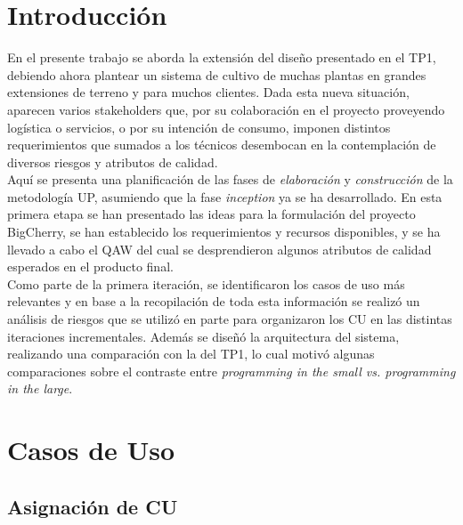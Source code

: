 \section{Introducción}

En el presente trabajo se aborda la extensión del diseño presentado en el TP1, debiendo ahora plantear un sistema de cultivo de muchas plantas en grandes extensiones de terreno y para muchos clientes. Dada esta nueva situación, aparecen varios stakeholders que, por su colaboración en el proyecto proveyendo logística o servicios, o por su intención de consumo, imponen distintos requerimientos que sumados a los técnicos desembocan en la contemplación de diversos riesgos y atributos de calidad.\\
\indent Aquí se presenta una planificación de las fases de \textit{elaboración} y \textit{construcción} de la metodología UP, asumiendo que la fase \textit{inception} ya se ha desarrollado. En esta primera etapa se han presentado las ideas para la formulación del proyecto BigCherry, se han establecido los requerimientos y recursos disponibles, y se ha llevado a cabo el QAW del cual se desprendieron algunos atributos de calidad esperados en el producto final.\\
\indent Como parte de la primera iteración, se identificaron los casos de uso más relevantes y en base a la recopilación de toda esta información se realizó un análisis de riesgos que se utilizó en parte para organizaron los CU en las distintas iteraciones incrementales. Además se diseñó la arquitectura del sistema, realizando una comparación con la del TP1, lo cual motivó algunas comparaciones sobre el contraste entre \textit{programming in the small vs. programming in the large}. 

\section{Casos de Uso}

\subsection{Asignación de CU}

